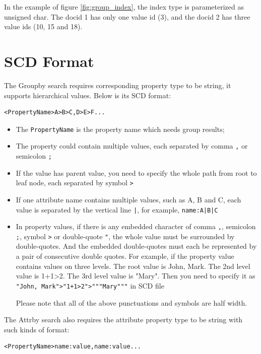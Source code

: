 In the example of figure \ref{fig:group_index}, the index type is parameterized as unsigned char. The docid 1 has only one value id (3), and the docid 2 has three value ids 
(10, 15 and 18).


\section{SCD Format}

The Groupby search requires corresponding property type to be string, it supports hierarchical values. Below is its SCD format:
\begin{lstlisting}
<PropertyName>A>B>C,D>E>F...
\end{lstlisting}

\begin{itemize}
\item The \verb!PropertyName! is the property name which needs group results;
\item The property could contain multiple values, each separated by comma \verb!,! or semicolon \verb!;!
\item If the value has parent value, you need to specify the whole path from root to leaf node, each separated by symbol \verb!>!
\item If one attribute name contains multiple values, such as A, B and C, each value is separated by the vertical line \verb!|!, for example, \verb!name:A|B|C!
\item In property values, if there is any embedded character of comma \verb!,!, semicolon \verb!;!, symbol \verb!>! or double-quote \verb!"!,
the whole value must be surrounded by double-quotes.
And the embedded double-quotes must each be represented by a pair of consecutive double quotes.
For example, if the property value contains values on three levels. The root value is John, Mark. The 2nd level value is 1+1>2. The 3rd level value is "Mary".
Then you need to specify it as \verb!"John, Mark">"1+1>2">"""Mary"""! in SCD file

Please note that all of the above punctuations and symbols are half width.

\end{itemize}

The Attrby search also requires the attribute property type to be string with such kinds of format:
\begin{lstlisting}
<PropertyName>name:value,name:value...
\end{lstlisting}


